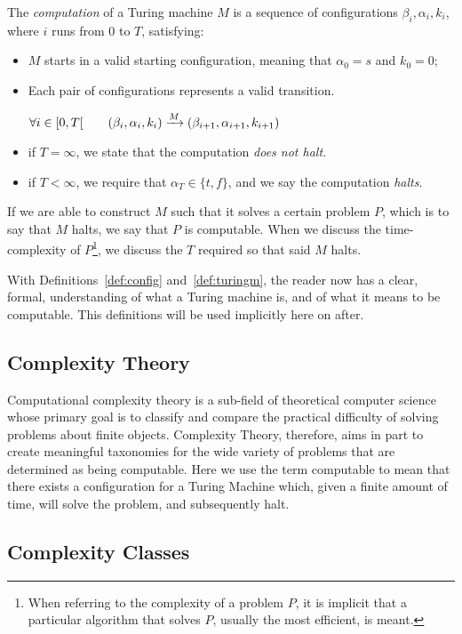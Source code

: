 \documentclass[11pt,letterpaper]{article}
\theoremstyle{definition}
\begin{document}
The \emph{computation} of a Turing machine \(M \) is a sequence of configurations \(\beta_i, \alpha_i, k_i \), where \(i \) runs from \(0 \) to \(T \), satisfying:
\begin{itemize}
	\item \(M \) starts in a valid starting configuration, meaning that \(\alpha_0 = s \) and \(k_0 = 0 \);
	\item Each pair of configurations represents a valid transition.

	      \(\forall i\in\interval[open right]{0}{T}\qquad(\beta_i, \alpha_i, k_i)\xrightarrow{M}(\beta_{i+1}, \alpha_{i+1}, k_{i+1}) \)

	\item if \(T = \infty \), we state that the computation \emph{does not halt.}
	\item if \(T < \infty \), we require that \(\alpha_T \in \{t, f\} \), and we say the computation \emph{halts}.
\end{itemize}

If we are able to construct \(M\) such that it solves a certain problem \(P\), which is to say that \(M\) halts, we say that \(P\) is computable. When we discuss the time-complexity of \(P\)\footnote{When referring to the complexity of a problem \(P\), it is implicit that a particular algorithm that solves \(P\), usually the most efficient, is meant.}, we discuss the \(T\) required so that said \(M\) halts.

With Definitions~\ref{def:config} and~\ref{def:turingm}, the reader now has a clear, formal, understanding of what a Turing machine is, and of what it means to be computable. This definitions will be used implicitly here on after.

\subsection{Complexity Theory}
Computational complexity theory is a sub-field of theoretical computer science whose primary goal is to classify and compare the practical difficulty of solving problems about finite objects.\autocite{sep-computational-complexity} Complexity Theory, therefore, aims in part to create meaningful taxonomies for the wide variety of problems that are determined as being computable. Here we use the term computable to mean that there exists a configuration for a Turing Machine which, given a finite amount of time, will solve the problem, and subsequently halt.

\subsection{Complexity Classes}
\end{document}
